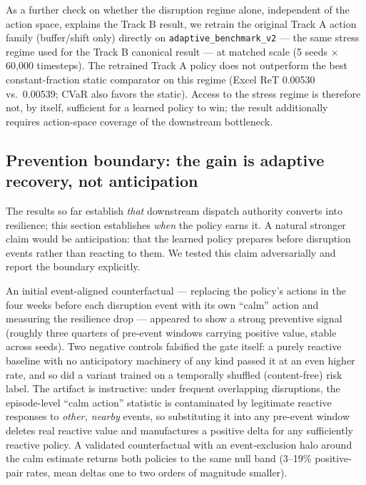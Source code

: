 As a further check on whether the disruption regime alone, independent of
the action space, explains the Track B result, we retrain the original
Track A action family (buffer/shift only) directly on
\texttt{adaptive\_benchmark\_v2} --- the same stress regime used for the
Track B canonical result --- at matched scale (5 seeds $\times$ 60{,}000
timesteps). The retrained Track A policy does not outperform the best
constant-fraction static comparator on this regime (Excel ReT 0.00530 vs.\
0.00539; CVaR also favors the static). Access to the stress regime is
therefore not, by itself, sufficient for a learned policy to win; the
result additionally requires action-space coverage of the downstream
bottleneck.

\hypertarget{48-prevention-boundary}{%
\subsection{Prevention boundary: the gain is adaptive recovery, not
anticipation}\label{48-prevention-boundary}}

The results so far establish \emph{that} downstream dispatch authority
converts into resilience; this section establishes \emph{when} the policy
earns it. A natural stronger claim would be anticipation: that the
learned policy prepares before disruption events rather than reacting to
them. We tested this claim adversarially and report the boundary
explicitly.

An initial event-aligned counterfactual --- replacing the policy's
actions in the four weeks before each disruption event with its own
``calm'' action and measuring the resilience drop --- appeared to show a
strong preventive signal (roughly three quarters of pre-event windows
carrying positive value, stable across seeds). Two negative controls
falsified the gate itself: a purely reactive baseline with no
anticipatory machinery of any kind passed it at an even higher rate, and
so did a variant trained on a temporally shuffled (content-free) risk
label. The artifact is instructive: under frequent overlapping
disruptions, the episode-level ``calm action'' statistic is contaminated
by legitimate reactive responses to \emph{other, nearby} events, so
substituting it into any pre-event window deletes real reactive value
and manufactures a positive delta for any sufficiently reactive policy.
A validated counterfactual with an event-exclusion halo around the calm
estimate returns both policies to the same null band (3--19\%
positive-pair rates, mean deltas one to two orders of magnitude smaller).

